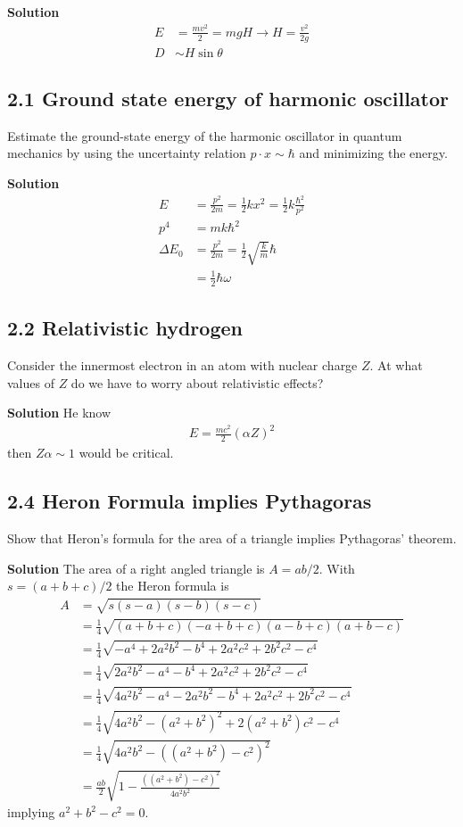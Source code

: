 \documentclass[10pt,a4paper]{book}
\theoremstyle{definition}
\begin{document}
{\bf Solution\newline}
\begin{align}
E&=\frac{mv^2}{2}=mgH\rightarrow H=\frac{v^2}{2g}\\
D&\sim H\sin\theta
\end{align}

\subsection{2.1 Ground state energy of harmonic oscillator}
Estimate the ground-state energy of the harmonic oscillator in quantum mechanics by using the uncertainty relation $p \cdot x \sim \hbar$ and minimizing the energy.

{\bf Solution\newline}
\begin{align}
E&=\frac{p^2}{2m}=\frac{1}{2}kx^2=\frac{1}{2}k\frac{\hbar^2}{p^2}\\
p^4&=mk\hbar^2\\
\Delta E_0&=\frac{p^2}{2m}=\frac{1}{2}\sqrt{\frac{k}{m}}\hbar\\
&=\frac{1}{2}\hbar\omega
\end{align}

\subsection{2.2 Relativistic hydrogen}
Consider the innermost electron in an atom with nuclear charge $Z$. At what values of $Z$ do we have to worry about relativistic effects?

{\bf Solution\newline}
He know
\begin{align}
E=\frac{mc^2}{2}(\alpha Z)^2
\end{align}
then $Z\alpha\sim1$ would be critical.

\subsection{2.4 Heron Formula implies Pythagoras}
Show that Heron’s formula for the area of a triangle implies Pythagoras’ theorem.

{\bf Solution\newline}
The area of a right angled triangle is $A=ab/2$. With $s=(a+b+c)/2$ the Heron formula is
\begin{align}
A&=\sqrt{s(s-a)(s-b)(s-c)}\\
&=\frac{1}{4}\sqrt{(a+b+c)(-a+b+c)(a-b+c)(a+b-c)}\\
&=\frac{1}{4}\sqrt{-a^4+2a^2 b^2-b^4+2a^2c^2+2 b^2 c^2-c^4}\\
&=\frac{1}{4}\sqrt{2a^2 b^2-a^4-b^4+2a^2c^2+2b^2c^2-c^4}\\
&=\frac{1}{4}\sqrt{4a^2 b^2-a^4-2a^2b^2-b^4+2a^2c^2+2b^2c^2-c^4}\\
&=\frac{1}{4}\sqrt{4a^2 b^2-(a^2+b^2)^2+2(a^2+b^2)c^2-c^4}\\
&=\frac{1}{4}\sqrt{4a^2 b^2-((a^2+b^2)-c^2)^2}\\
&=\frac{ab}{2}\sqrt{1-\frac{((a^2+b^2)-c^2)^2}{4a^2b^2}}
\end{align}
implying $a^2+b^2-c^2=0$.
\end{document}
